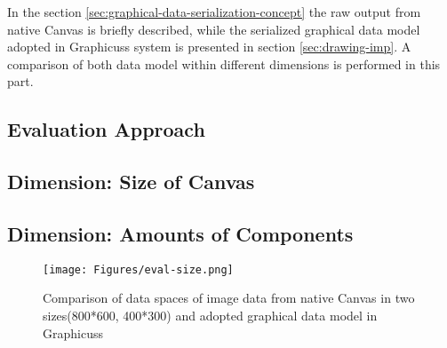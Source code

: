 In the section \ref{sec:graphical-data-serialization-concept} the raw output from native Canvas is briefly described, while the serialized graphical data model adopted in Graphicuss system is presented in section \ref{sec:drawing-imp}. A comparison of both data model within different dimensions is performed in this part.

\subsection{Evaluation Approach}



\subsection{Dimension: Size of Canvas}



\subsection{Dimension: Amounts of Components}


\begin{figure}[!htbp]
  \centering
    \texttt{[image: Figures/eval-size.png]}
  \caption{Comparison of data spaces of image data from native Canvas in two sizes(800*600, 400*300) and adopted graphical data model in Graphicuss}
  \label{fig:eval-nielsen}
\end{figure}